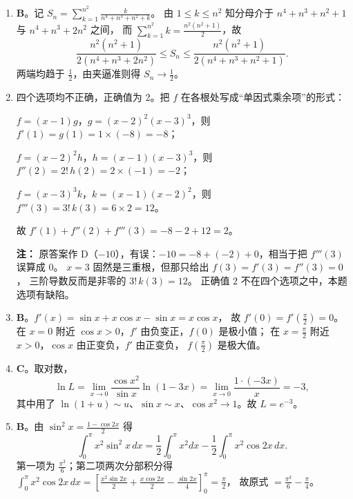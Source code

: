 \begin{enumerate}
{\begin{enumerate}
	\item
	\textbf{B}。记 $S_n=\sum\limits_{k=1}^{n^2}\frac{k}{n^4+n^3+n^2+k}$。
	由 $1\leqslant k\leqslant n^2$ 知分母介于 $n^4+n^3+n^2+1$ 与 $n^4+n^3+2n^2$ 之间，
	而 $\sum\limits_{k=1}^{n^2}k=\frac{n^2\left(n^2+1\right)}{2}$，故
	\[
	\frac{n^2\left(n^2+1\right)}{2\left(n^4+n^3+2n^2\right)}\leqslant S_n
	\leqslant\frac{n^2\left(n^2+1\right)}{2\left(n^4+n^3+n^2+1\right)} .
	\]
	两端均趋于 $\frac12$，由夹逼准则得 $S_n\to\frac12$。

	\item
	四个选项均不正确，正确值为 $2$。把 $f$ 在各根处写成“单因式乘余项”的形式：

	$f=(x-1)g$，$g=(x-2)^2(x-3)^3$，则 $f'(1)=g(1)=1\times(-8)=-8$；

	$f=(x-2)^2h$，$h=(x-1)(x-3)^3$，则 $f''(2)=2!\,h(2)=2\times(-1)=-2$；

	$f=(x-3)^3k$，$k=(x-1)(x-2)^2$，则 $f'''(3)=3!\,k(3)=6\times2=12$。

	故 $f'(1)+f''(2)+f'''(3)=-8-2+12=2$。

	\par\vspace{1mm}\noindent
	\textbf{注：}{\kaishu
	原答案作 D（$-10$），有误：$-10=-8+(-2)+0$，相当于把 $f'''(3)$ 误算成 $0$。
	$x=3$ 固然是三重根，但那只给出 $f(3)=f'(3)=f''(3)=0$，
	三阶导数反而是非零的 $3!\,k(3)=12$。
	正确值 $2$ 不在四个选项之中，本题选项有缺陷。
	}\par

	\item
	\textbf{B}。$f'(x)=\sin x+x\cos x-\sin x=x\cos x$，
	故 $f'(0)=f'\left(\frac{\pi}{2}\right)=0$。
	在 $x=0$ 附近 $\cos x>0$，$f'$ 由负变正，$f(0)$ 是极小值；
	在 $x=\frac{\pi}{2}$ 附近 $x>0$，$\cos x$ 由正变负，$f'$ 由正变负，
	$f\left(\frac{\pi}{2}\right)$ 是极大值。

	\item
	\textbf{C}。取对数，
	\[
	\ln L=\lim_{x\to0}\frac{\cos x^2}{\sin x}\ln(1-3x)
	=\lim_{x\to0}\frac{1\cdot(-3x)}{x}=-3 ,
	\]
	其中用了 $\ln(1+u)\sim u$、$\sin x\sim x$、$\cos x^2\to1$。故 $L=e^{-3}$。

	\item
	\textbf{B}。由 $\sin^2x=\frac{1-\cos2x}{2}$ 得
	\[
	\int_0^{\pi}x^2\sin^2x\,dx=\frac12\int_0^{\pi}x^2dx-\frac12\int_0^{\pi}x^2\cos2x\,dx .
	\]
	第一项为 $\frac{\pi^3}{6}$；第二项两次分部积分得
	$\int_0^{\pi}x^2\cos2x\,dx=\left[\frac{x^2\sin2x}{2}+\frac{x\cos2x}{2}-\frac{\sin2x}{4}\right]_0^{\pi}=\frac{\pi}{2}$，
	故原式 $=\frac{\pi^3}{6}-\frac{\pi}{4}$。


\end{enumerate}}
\end{enumerate}
